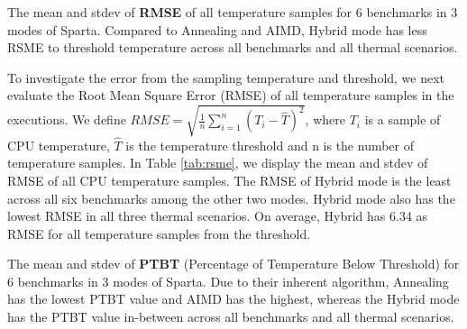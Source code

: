 \begin{table}[t]
\caption{The mean and stdev of \textbf{RMSE} of all temperature samples for 6 benchmarks in 3 modes of Sparta. Compared to Annealing and AIMD, Hybrid mode has less RSME to threshold temperature across all benchmarks and all thermal scenarios.}\label{tab:rsme}
\vspace{1mm}
\centering
\resizebox{350pt}{!}{}
\newline
\vspace{3mm}
\newline
\resizebox{300pt}{!}{}
\end{table}


To investigate the error from the sampling temperature and threshold, we next evaluate the Root Mean Square Error (RMSE) of all temperature samples in the executions. We define $RMSE = \sqrt{\frac{1}{n}\sum_{i=1}^{n}(T_i - \hat{T})^2}$, where $T_i$ is a sample of CPU temperature, $\hat{T}$ is the temperature threshold and n is the number of temperature samples. In Table \ref{tab:rsme}, we display the mean and stdev of RMSE of all CPU temperature samples. The RMSE of Hybrid mode is the least across all six benchmarks among the other two modes. Hybrid mode also has the lowest RMSE in all three thermal scenarios. On average, Hybrid has 6.34 as RMSE for all temperature samples from the threshold. 


\begin{table}[t]
\caption{The mean and stdev of \textbf{PTBT} (Percentage of Temperature Below Threshold) for 6 benchmarks in 3 modes of Sparta. Due to their inherent algorithm, Annealing has the lowest PTBT value and AIMD has the highest, whereas the Hybrid mode has the PTBT value in-between across all benchmarks and all thermal scenarios.}\label{tab:percent}
\vspace{1mm}
\centering
\resizebox{350pt}{!}{}
\newline
\vspace{3mm}
\newline
\resizebox{300pt}{!}{}
\end{table}


